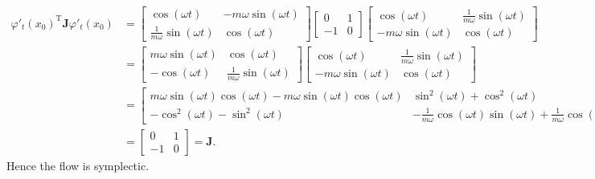 \documentclass{report}
\theoremstyle{exampstyle} \newtheorem{example}[theorem]{Example}
\theoremstyle{exampstyle} \newtheorem{remark}[theorem]{Remark}
\theoremstyle{exampstyle} \newtheorem{definition}[theorem]{Definition}
\theoremstyle{exampstyle} \newtheorem{lemma}[theorem]{Lemma}
\begin{document}
\begin{align*}
	\varphi'_t(x_0)^\mathrm{T} \mathbf{J} \varphi'_t(x_0) &= \begin{bmatrix}
		\cos(\omega t) & -m\omega \sin(\omega t) \\
		\frac{1}{m\omega} \sin(\omega t) & \cos(\omega t)
	\end{bmatrix} \begin{bmatrix}
		0 & 1 \\
		-1 & 0
	\end{bmatrix} \begin{bmatrix}
		\cos(\omega t) & \frac{1}{m\omega} \sin(\omega t) \\
		-m\omega \sin(\omega t) & \cos(\omega t)
	\end{bmatrix} \\
	&= \begin{bmatrix}
		m \omega \sin(\omega t) & \cos(\omega t) \\
		-\cos(\omega t) & \frac{1}{m \omega} \sin(\omega t)
	\end{bmatrix} \begin{bmatrix}
		\cos(\omega t) & \frac{1}{m\omega} \sin(\omega t) \\
		-m\omega \sin(\omega t) & \cos(\omega t)
	\end{bmatrix} \\
	&= \begin{bmatrix}
		m \omega \sin(\omega t) \cos(\omega t) - m \omega \sin(\omega t) \cos(\omega t)  & \sin^2(\omega t) + \cos^2(\omega t) \\
		-\cos^2(\omega t) - \sin^2(\omega t) & -\frac{1}{m\omega}\cos(\omega t)\sin(\omega t) + \frac{1}{m \omega}\cos(\omega t)\sin(\omega t)
	\end{bmatrix} \\
	&= \begin{bmatrix}
		0 & 1 \\
		-1 & 0
	\end{bmatrix} = \mathbf{J}.
\end{align*}
Hence the flow is symplectic.
\end{document}
